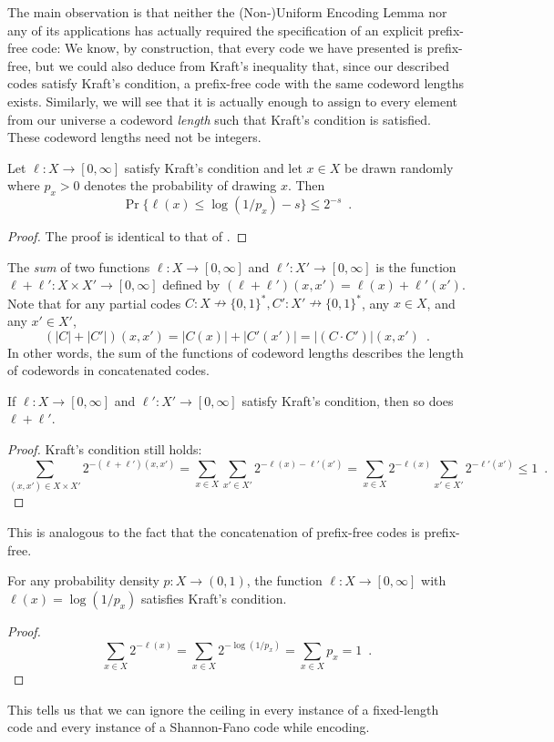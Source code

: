 \documentclass[prodmode,acmcsur]{acmsmall}
\begin{document}
The main observation is that neither the (Non-)Uniform Encoding Lemma
nor any of its applications has actually required the specification of an
explicit
prefix-free code: We know, by construction, that every code we have
presented is
prefix-free, but we could also deduce from Kraft's inequality that,
since our described codes satisfy Kraft's condition, a prefix-free
code with the same codeword lengths exists. Similarly, we will see that
it is actually enough to assign to every element from our universe
a codeword \emph{length} such that Kraft's condition is satisfied. These
codeword lengths need not be integers.

\begin{lem}
  Let $\ell : X \to [0, \infty]$ satisfy Kraft's condition and let
  $x\in X$ be drawn randomly where $p_x > 0$ denotes the probability
  of drawing $x$.  Then
  \[
    \Pr\{ \ell(x) \le \log(1/p_x)-s\} \le 2^{-s} \enspace .
  \]
\end{lem}
\begin{proof}
  The proof is identical to that of .
\end{proof}

The \emph{sum} of two functions $\ell : X \to [0, \infty]$ and
$\ell' : X' \to [0, \infty]$ is the function
$\ell + \ell' : X \times X' \to [0, \infty]$ defined by
$(\ell + \ell') (x, x') = \ell(x) + \ell'(x')$. Note that for any
partial codes
$C : X \nrightarrow \{0, 1\}^*, C' : X' \nrightarrow \{0, 1\}^*$, any
$x \in X$, and any $x' \in X'$,
\[
(|C| + |C'|)(x, x') = |C(x)| + |C'(x')| = |(C \cdot C')|(x, x') \enspace .
\]
In other words, the sum of the functions of codeword lengths describes
the length of codewords in concatenated codes.

\begin{lem}
  If $\ell : X \to [0, \infty]$ and $\ell' : X' \to [0,
  \infty]$ satisfy Kraft's condition, then so does $\ell + \ell'$.
\end{lem}
\begin{proof}
  Kraft's condition still holds:
  \[
  \sum_{(x, x') \in X \times X'} 2^{-(\ell + \ell')(x, x')} = \sum_{x
    \in X} \sum_{x' \in X'} 2^{-\ell(x) - \ell'(x')} = \sum_{x \in X}
  2^{-\ell(x)} \sum_{x' \in X'} 2^{-\ell'(x')} \leq 1 \enspace
  . %
  \]
\end{proof}
This is analogous to the fact that the concatenation of prefix-free
codes is prefix-free.

\begin{lem}
  For any probability density $p : X \to (0, 1)$, the function
  $\ell : X \to [0, \infty]$ with $\ell(x) = \log (1/p_x)$ satisfies
  Kraft's condition.
\end{lem}
\begin{proof}
  \[
  \sum_{x \in X} 2^{-\ell(x)} = \sum_{x \in X} 2^{-\log (1/p_x)} =
  \sum_{x \in X} p_x = 1 \enspace . %
  \]
\end{proof}
This tells us that we can ignore the ceiling in every instance of a
fixed-length code and every instance of a Shannon-Fano code while
encoding.
\end{document}
